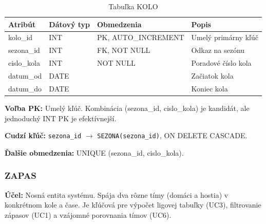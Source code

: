 \documentclass[11pt, a4paper]{article}
\begin{document}
\begin{table}[H]
    \centering
    \caption{Tabuľka KOLO}
    \label{tab:kolo}
    \begin{tabular}{l l l l}
        \toprule
        \textbf{Atribút} & \textbf{Dátový typ} & \textbf{Obmedzenia} & \textbf{Popis} \\
        \midrule
        kolo\_id    & INT  & PK, AUTO\_INCREMENT & Umelý primárny kľúč \\
        sezona\_id  & INT  & FK, NOT NULL        & Odkaz na sezónu \\
        cislo\_kola & INT  & NOT NULL            & Poradové číslo kola \\
        datum\_od   & DATE &                     & Začiatok kola \\
        datum\_do   & DATE &                     & Koniec kola \\
        \bottomrule
    \end{tabular}
\end{table}

\textbf{Voľba PK:} Umelý kľúč. Kombinácia (sezona\_id, cislo\_kola) je kandidát, ale jednoduchý INT PK je efektívnejší.

\textbf{Cudzí kľúč:} \texttt{sezona\_id} $\rightarrow$ \texttt{SEZONA(sezona\_id)}, ON DELETE CASCADE.

\textbf{Ďalšie obmedzenia:} UNIQUE (sezona\_id, cislo\_kola).

\subsubsection{ZAPAS}
\textbf{Účel:} Nosná entita systému. Spája dva rôzne tímy (domáci a hostia) v konkrétnom kole a čase. Je kľúčová pre výpočet ligovej tabuľky (UC3), filtrovanie zápasov (UC1) a vzájomné porovnania tímov (UC6).
\end{document}
